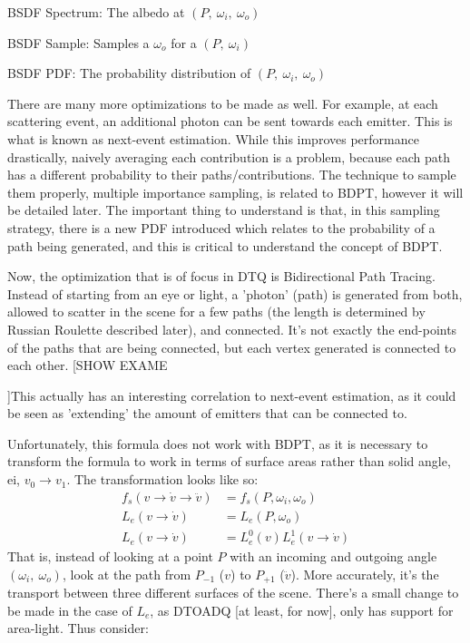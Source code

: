\documentclass{article}
\begin{document}
  \begin{list}{}{}
  \item BSDF Spectrum: The albedo at $(P,\:\omega_i,\:\omega_o)$
  \item BSDF Sample: Samples a $\omega_o$ for a $(P,\:\omega_i)$
  \item BSDF PDF: The probability distribution of $(P,\:\omega_i,\:\omega_o)$
  \end{list}
  
  There are many more optimizations to be made as well. For example, at each scattering event, an additional photon can be sent towards each emitter. This is what is known as next-event estimation. While this improves performance drastically, naively averaging each contribution is a problem, because each path has a different probability to their paths/contributions. The technique to sample them properly, multiple importance sampling, is related to BDPT, however it will be detailed later. The important thing to understand is that, in this sampling strategy, there is a new PDF introduced which relates to the probability of a path being generated, and this is critical to understand the concept of BDPT.
  
  Now, the optimization that is of focus in DTQ is Bidirectional Path Tracing. Instead of starting from an eye or light, a 'photon' (path) is generated from both, allowed to scatter in the scene for a few paths (the length is determined by Russian Roulette described later), and connected. It's not exactly the end-points of the paths that are being connected, but each vertex generated is connected to each other. [SHOW EXAM{E}
  
  ]This actually has an interesting correlation to next-event estimation, as it could be seen as 'extending' the amount of emitters that can be connected to. 
  
  Unfortunately, this formula does not work with BDPT, as it is necessary to transform the formula to work in terms of surface areas rather than solid angle, ei, $v_0 \rightarrow v_1$. The transformation looks like so:
  \begin{align}
    f_s(v \rightarrow \dot{v} \rightarrow \ddot{v}) &= f_s(P, \omega_i,
                                                      \omega_o)\\
    L_e(v \rightarrow \dot{v}) &= L_e(P, \omega_o)\\
    L_e(v \rightarrow \dot{v}) &= L_e^0(v) L_e^1(v \rightarrow \dot{v})
  \end{align}
    That is, instead of looking at a point $P$ with an incoming and outgoing
    angle $(\omega_i,\:\omega_o)$, look at the path from $P_{-1}$ ($v$) to
    $P_{+1}$ ($\ddot{v}$). More accurately, it's the transport between
    three different surfaces of the scene. There's a small change to be made in the case of $L_e$, as DTOADQ [at least, for now], only has support for area-light. Thus consider:
\end{document}
